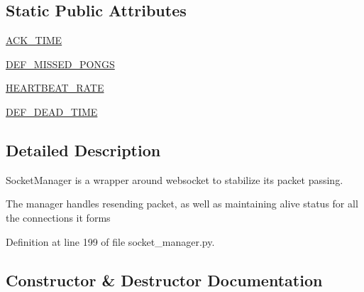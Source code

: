 \subsection*{Static Public Attributes}
\begin{DoxyCompactItemize}
\item 
\hyperlink{classparlai_1_1mturk_1_1core_1_1socket__manager_1_1SocketManager_ad170381c2941af2fc6273559402ff22f}{A\+C\+K\+\_\+\+T\+I\+ME}
\item 
\hyperlink{classparlai_1_1mturk_1_1core_1_1socket__manager_1_1SocketManager_a057fdcc6941e8aef40af1b12d7a24572}{D\+E\+F\+\_\+\+M\+I\+S\+S\+E\+D\+\_\+\+P\+O\+N\+GS}
\item 
\hyperlink{classparlai_1_1mturk_1_1core_1_1socket__manager_1_1SocketManager_a397c2f186e18af9a720f084047b66672}{H\+E\+A\+R\+T\+B\+E\+A\+T\+\_\+\+R\+A\+TE}
\item 
\hyperlink{classparlai_1_1mturk_1_1core_1_1socket__manager_1_1SocketManager_aa33dad44c7c32e6ed95a868c39dc727e}{D\+E\+F\+\_\+\+D\+E\+A\+D\+\_\+\+T\+I\+ME}
\end{DoxyCompactItemize}


\subsection{Detailed Description}
\begin{DoxyVerb}SocketManager is a wrapper around websocket to stabilize its packet passing.

The manager handles resending packet, as well as maintaining alive status for all
the connections it forms
\end{DoxyVerb}
 

Definition at line 199 of file socket\+\_\+manager.\+py.



\subsection{Constructor \& Destructor Documentation}
\mbox{\label{classparlai_1_1mturk_1_1core_1_1socket__manager_1_1SocketManager_ad366f39cbef4d0d8307cf350cd088ff9}} 
